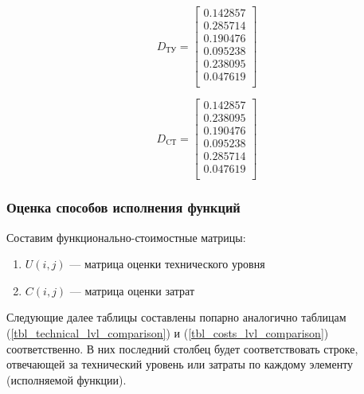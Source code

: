 \begin{equation}
    D_\text{ТУ} =
    \begin{bmatrix}
        0.142857 \\
        0.285714 \\
        0.190476 \\
        0.095238 \\
        0.238095 \\
        0.047619 \\
    \end{bmatrix}
    \label{eq_tu_matrix}
\end{equation}

\begin{equation}
    D_\text{CТ} =
    \begin{bmatrix}
        0.142857 \\
        0.238095 \\
        0.190476 \\
        0.095238 \\
        0.285714 \\
        0.047619 \\
    \end{bmatrix}
    \label{eq_st_matrix}
\end{equation}

\subsubsection{Оценка способов исполнения функций}
Составим функционально-стоимостные матрицы:
\begin{enumerate}
    \item $U(i,j)$ --- матрица оценки технического уровня
    \item $C(i,j)$ --- матрица оценки затрат
\end{enumerate}

Следующие далее таблицы составлены попарно аналогично таблицам
(\ref{tbl_technical_lvl_comparison}) и (\ref{tbl_costs_lvl_comparison})
соответственно. В них последний столбец будет соответствовать строке, отвечающей
за технический уровень или затраты по каждому элементу (исполняемой функции).

